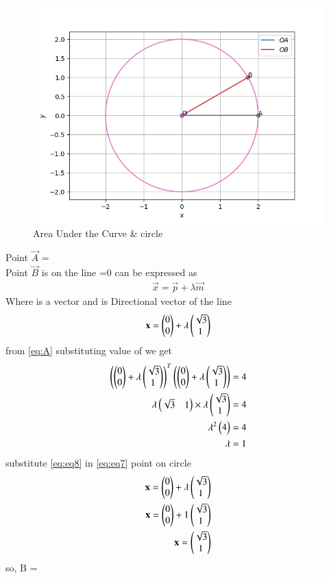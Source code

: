 \documentclass[journal,12pt,twocolumn]{IEEEtran}
\begin{document}
\begin{figure}[H]
\centering
\includegraphics[width=\columnwidth]{circle.png}
\caption{Area Under the Curve & circle  }
\label{fig:1}
\end{figure}
Point $\vec{A}$ =  \\
Point $\vec{B}$ is on the line =0 can be expressed as
\begin{align}
   \vec{x}=\vec{p}+\lambda \vec{m} 
\end{align}
 Where  is a vector and  is Directional vector of the line
\begin{align}
    \mathbf{x}=\begin{pmatrix}0 \\ 0\end{pmatrix}+ \lambda \begin{pmatrix}\sqrt{3} \\ 1\end{pmatrix} \label{eq:eq7}
\end{align}
from \eqref{eq:A} substituting value of  we get
\begin{align}
{\ensuremath{\begin{pmatrix}{\ensuremath{\begin{pmatrix}0 \\ 0\end{pmatrix}}+ \lambda \ensuremath{\begin{pmatrix}\sqrt{3} \\ 1\end{pmatrix}}}\end{pmatrix}} ^T \ensuremath{\begin{pmatrix} \begin{pmatrix}0 \\ 0\end{pmatrix}+ \lambda \begin{pmatrix}\sqrt{3} \\ 1\end{pmatrix}\end{pmatrix}}} =4 \\
\lambda \begin{pmatrix}\sqrt{3} & 1\end{pmatrix} \times \lambda \begin{pmatrix}\sqrt{3} \\ 1\end{pmatrix}=4 \\
\lambda ^2  \begin{pmatrix}4\end{pmatrix} =4 \\    
\lambda =1 \label{eq:eq8}
\end{align}
substitute \eqref{eq:eq8} in \eqref{eq:eq7} point on circle
\begin{align}
    \mathbf{x}=\begin{pmatrix}0 \\ 0\end{pmatrix}+ \lambda \begin{pmatrix}\sqrt{3} \\ 1\end{pmatrix} \\
    \mathbf{x}=\begin{pmatrix}0 \\ 0\end{pmatrix}+ 1 \begin{pmatrix}\sqrt{3} \\ 1\end{pmatrix} \\
    \mathbf{x}= \begin{pmatrix}\sqrt{3} \\ 1\end{pmatrix}
\end{align}
so, B =
\end{document}
